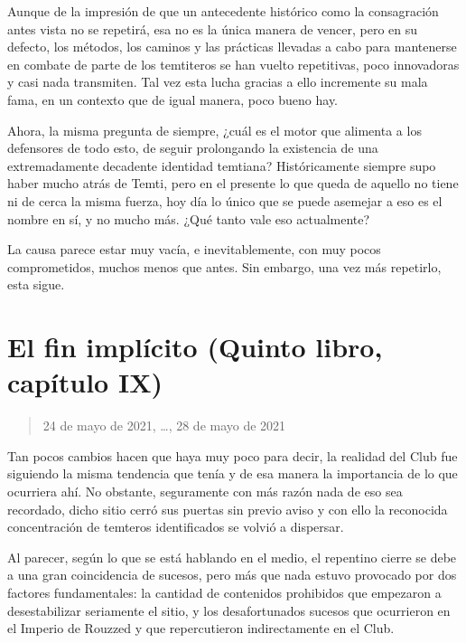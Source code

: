 \documentclass[
  spanish,
]{book}
\begin{document}
Aunque de la impresión de que un antecedente histórico como la consagración antes vista no se repetirá, esa no es la única manera de vencer, pero en su defecto, los métodos, los caminos y las prácticas llevadas a cabo para mantenerse en combate de parte de los temtiteros se han vuelto repetitivas, poco innovadoras y casi nada transmiten. Tal vez esta lucha gracias a ello incremente su mala fama, en un contexto que de igual manera, poco bueno hay.

Ahora, la misma pregunta de siempre, ¿cuál es el motor que alimenta a los defensores de todo esto, de seguir prolongando la existencia de una extremadamente decadente identidad temtiana? Históricamente siempre supo haber mucho atrás de Temti, pero en el presente lo que queda de aquello no tiene ni de cerca la misma fuerza, hoy día lo único que se puede asemejar a eso es el nombre en sí, y no mucho más. ¿Qué tanto vale eso actualmente?

La causa parece estar muy vacía, e inevitablemente, con muy pocos comprometidos, muchos menos que antes. Sin embargo, una vez más repetirlo, esta sigue.

\hypertarget{el-fin-impluxedcito-quinto-libro-capuxedtulo-ix}{%
\section{El fin implícito (Quinto libro, capítulo IX)}\label{el-fin-impluxedcito-quinto-libro-capuxedtulo-ix}}

\begin{quote}
24 de mayo de 2021, \ldots, 28 de mayo de 2021
\end{quote}

Tan pocos cambios hacen que haya muy poco para decir, la realidad del Club fue siguiendo la misma tendencia que tenía y de esa manera la importancia de lo que ocurriera ahí. No obstante, seguramente con más razón nada de eso sea recordado, dicho sitio cerró sus puertas sin previo aviso y con ello la reconocida concentración de temteros identificados se volvió a dispersar.

Al parecer, según lo que se está hablando en el medio, el repentino cierre se debe a una gran coincidencia de sucesos, pero más que nada estuvo provocado por dos factores fundamentales: la cantidad de contenidos prohibidos que empezaron a desestabilizar seriamente el sitio, y los desafortunados sucesos que ocurrieron en el Imperio de Rouzzed y que repercutieron indirectamente en el Club.
\end{document}
